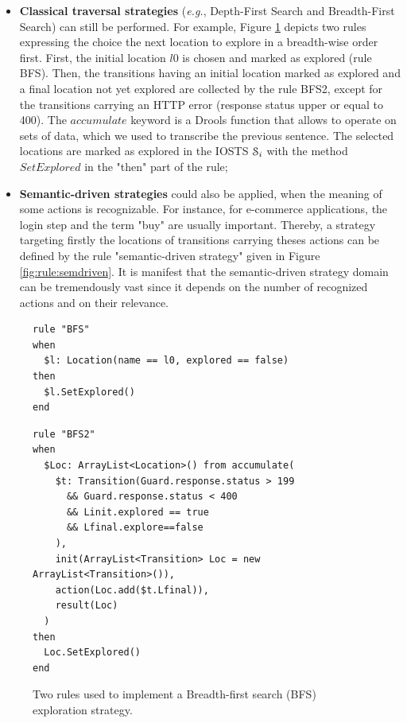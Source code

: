 \begin{itemize}
    \item \textbf{Classical traversal strategies} (\emph{e.g.},
        Depth-First Search and Breadth-First Search) can still be
        performed.  For example, Figure \ref{fig:rule:bfs}
        depicts two rules expressing the choice the next location
        to explore in a breadth-wise order first. First, the
        initial location $l0$ is chosen and marked as explored
        (rule BFS).  Then, the transitions having an initial
        location marked as explored and a final location not yet
        explored are collected by the rule BFS2, except for the
        transitions carrying an HTTP error (response status upper
        or equal to 400).  The $accumulate$ keyword is a Drools
        function that allows to operate on sets of data, which we
        used to transcribe the previous sentence.  The selected
        locations are marked as explored in the IOSTS
        $\EuScript{S}_i$ with the method $SetExplored$ in the
        "then" part of the rule;

    \item \textbf{Semantic-driven strategies} could also be
        applied, when the meaning of some actions is
        recognizable. For instance, for e-commerce applications,
        the login step and the term "buy" are usually important.
        Thereby, a strategy targeting firstly the locations of
        transitions carrying theses actions can be defined by the
        rule "semantic-driven strategy" given in Figure
        \ref{fig:rule:semdriven}.  It is manifest that the
        semantic-driven strategy domain can be tremendously vast
        since it depends on the number of recognized actions and
        on their relevance.
\end{itemize}

\begin{figure}[h]
\begin{framed}
\begin{BVerbatim}
rule "BFS"
when
  $l: Location(name == l0, explored == false)
then
  $l.SetExplored()
end
\end{BVerbatim}
\end{framed}

\begin{framed}
\begin{BVerbatim}
rule "BFS2"
when
  $Loc: ArrayList<Location>() from accumulate(
    $t: Transition(Guard.response.status > 199
      && Guard.response.status < 400
      && Linit.explored == true
      && Lfinal.explore==false
    ),
    init(ArrayList<Transition> Loc = new ArrayList<Transition>()),
    action(Loc.add($t.Lfinal)),
    result(Loc)
  )
then
  Loc.SetExplored()
end
\end{BVerbatim}
\end{framed}

\caption{Two rules used to implement a Breadth-first search (BFS)
exploration strategy.}
\label{fig:rule:bfs}
\end{figure}

